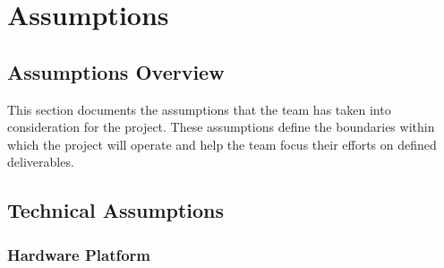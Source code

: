 
\section{Assumptions}

\subsection{Assumptions Overview}

This section documents the assumptions that the team has taken into consideration for the project. These assumptions define the boundaries within which the project will operate and help the team focus their efforts on defined deliverables.

\subsection{Technical Assumptions}

\subsubsection{Hardware Platform}

